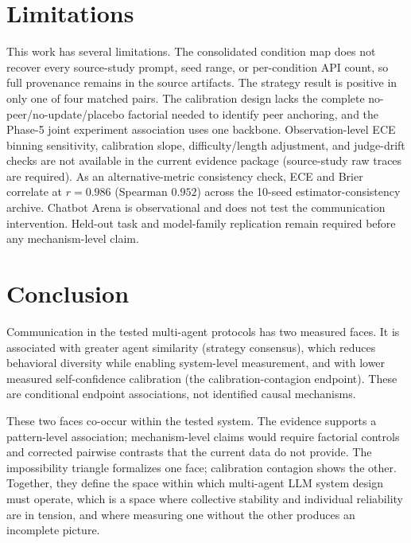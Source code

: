 \documentclass[11pt]{article}
\begin{document}
\section{Limitations}
This work has several limitations. The consolidated condition map does not recover every source-study prompt, seed range, or per-condition API count, so full provenance remains in the source artifacts. The strategy result is positive in only one of four matched pairs. The calibration design lacks the complete no-peer/no-update/placebo factorial needed to identify peer anchoring, and the Phase-5 joint experiment association uses one backbone. Observation-level ECE binning sensitivity, calibration slope, difficulty/length adjustment, and judge-drift checks are not available in the current evidence package (source-study raw traces are required). As an alternative-metric consistency check, ECE and Brier correlate at $r = 0.986$ (Spearman $0.952$) across the 10-seed estimator-consistency archive. Chatbot Arena is observational and does not test the communication intervention. Held-out task and model-family replication remain required before any mechanism-level claim.

\section{Conclusion}

Communication in the tested multi-agent protocols has two measured faces. It is associated with greater agent similarity (strategy consensus), which reduces behavioral diversity while enabling system-level measurement, and with lower measured self-confidence calibration (the calibration-contagion endpoint). These are conditional endpoint associations, not identified causal mechanisms.

These two faces co-occur within the tested system. The evidence supports a pattern-level association; mechanism-level claims would require factorial controls and corrected pairwise contrasts that the current data do not provide. The impossibility triangle formalizes one face; calibration contagion shows the other. Together, they define the space within which multi-agent LLM system design must operate, which is a space where collective stability and individual reliability are in tension, and where measuring one without the other produces an incomplete picture.
\end{document}
